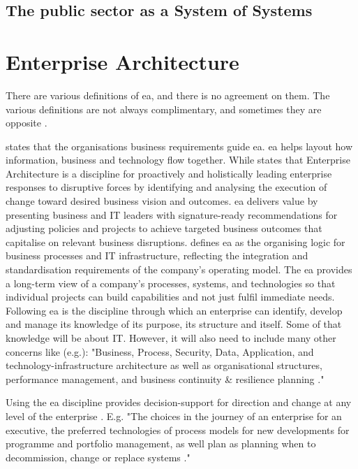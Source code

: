 \subsection{The public sector as a System of Systems}
\label{sub:tbpssystemofsystems}


\section{Enterprise Architecture}
\label{sec:tbenterprisearchitecture}
There are various definitions of \acrlong{ea}, and there is no agreement on them. The various definitions are not always complimentary, and sometimes they are opposite \parencites{Lapalme2012}{SaintLouis2019}{Hoogervorst2009}. 

\textcite{White2018} states that the organisations business requirements guide \acrshort{ea}. \acrshort{ea} helps layout how information, business and technology flow together. While \textcite{Gartner} states that Enterprise Architecture is a discipline for proactively and holistically leading enterprise responses to disruptive forces by identifying and analysing the execution of change toward desired business vision and outcomes. \acrshort{ea} delivers value by presenting business and IT leaders with signature-ready recommendations for adjusting policies and projects to achieve targeted business outcomes that capitalise on relevant business disruptions. \textcite[p.~9]{Ross2014} defines \acrshort{ea} as the organising logic for business processes and IT infrastructure, reflecting the integration and standardisation requirements of the company's operating model. The \acrshort{ea} provides a long-term view of a company's processes, systems, and technologies so that individual projects can build capabilities and not just fulfil immediate needs. Following \textcite[p.~4]{Graves2009} \acrshort{ea} is the discipline through which an enterprise can identify, develop and manage its knowledge of its purpose, its structure and itself. Some of that knowledge will be about IT. However, it will also need to include many other concerns like (e.g.): "Business, Process, Security, Data, Application, and technology-infrastructure architecture as well as organisational structures, performance management, and  business continuity \& resilience planning \parencite[p.~4]{Graves2009}."

Using the \acrshort{ea} discipline provides decision-support for direction and change at any level of the enterprise \parencite[p.~4]{Graves2009}. E.g. "The choices in the journey of an enterprise for an executive, the preferred technologies of process models for new developments for programme and portfolio management, as well plan as planning when to decommission, change or replace systems \parencite[p.~4]{Graves2009}."

